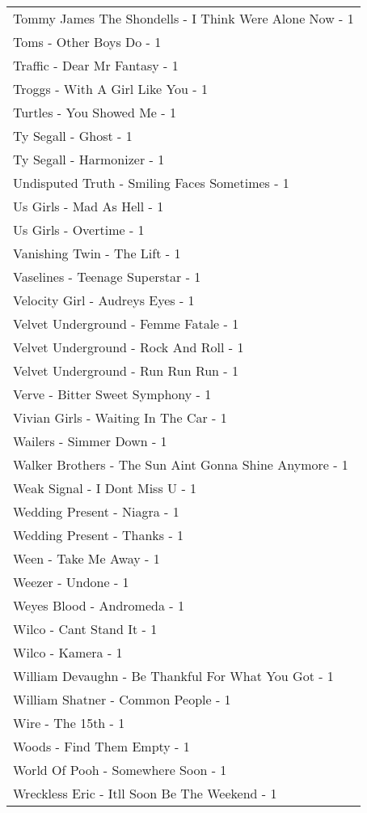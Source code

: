 \documentclass[
]{article}
\begin{document}
\begin{longtable}{l}
Tommy James The Shondells - I Think Were Alone Now - 1 \\ 
Toms - Other Boys Do - 1 \\ 
Traffic - Dear Mr Fantasy - 1 \\ 
Troggs - With A Girl Like You - 1 \\ 
Turtles - You Showed Me - 1 \\ 
Ty Segall - Ghost - 1 \\ 
Ty Segall - Harmonizer - 1 \\ 
Undisputed Truth - Smiling Faces Sometimes - 1 \\ 
Us Girls - Mad As Hell - 1 \\ 
Us Girls - Overtime - 1 \\ 
Vanishing Twin - The Lift - 1 \\ 
Vaselines - Teenage Superstar - 1 \\ 
Velocity Girl - Audreys Eyes - 1 \\ 
Velvet Underground - Femme Fatale - 1 \\ 
Velvet Underground - Rock And Roll - 1 \\ 
Velvet Underground - Run Run Run - 1 \\ 
Verve - Bitter Sweet Symphony - 1 \\ 
Vivian Girls - Waiting In The Car - 1 \\ 
Wailers - Simmer Down - 1 \\ 
Walker Brothers - The Sun Aint Gonna Shine Anymore - 1 \\ 
Weak Signal - I Dont Miss U - 1 \\ 
Wedding Present - Niagra - 1 \\ 
Wedding Present - Thanks - 1 \\ 
Ween - Take Me Away - 1 \\ 
Weezer - Undone - 1 \\ 
Weyes Blood - Andromeda - 1 \\ 
Wilco - Cant Stand It - 1 \\ 
Wilco - Kamera - 1 \\ 
William Devaughn - Be Thankful For What You Got - 1 \\ 
William Shatner - Common People - 1 \\ 
Wire - The 15th - 1 \\ 
Woods - Find Them Empty - 1 \\ 
World Of Pooh - Somewhere Soon - 1 \\ 
Wreckless Eric - Itll Soon Be The Weekend - 1 \\ 

\end{longtable}
\end{document}
